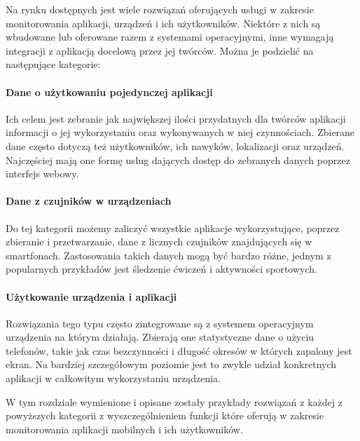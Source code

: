 Na rynku dostępnych jest wiele rozwiązań oferujących usługi w zakresie monitorowania aplikacji, urządzeń i ich użytkowników. Niektóre z nich są wbudowane lub oferowane razem z systemami operacyjnymi, inne wymagają integracji z aplikacją docelową przez jej twórców. Można je podzielić na następujące kategorie:

\paragraph{Dane o użytkowaniu pojedynczej aplikacji} 
Ich celem jest zebranie jak największej ilości przydatnych dla twórców aplikacji informacji o jej wykorzystaniu oraz wykonywanych w niej czynnościach. Zbierane dane często dotyczą też użytkowników, ich nawyków, lokalizacji oraz urządzeń. Najczęściej mają one formę usług dających dostęp do zebranych danych poprzez interfejs webowy. 

\paragraph{Dane z czujników w urządzeniach} 
Do tej kategorii możemy zaliczyć wszystkie aplikacje wykorzystujące, poprzez zbieranie i przetwarzanie, dane z licznych czujników znajdujących się w smartfonach. Zastosowania takich danych mogą być bardzo różne, jednym z popularnych przykładów jest śledzenie ćwiczeń i aktywności sportowych.

\paragraph{Użytkowanie urządzenia i aplikacji} 
Rozwiązania tego typu często zintegrowane są z systemem operacyjnym urządzenia na którym działają. Zbierają one statystyczne dane o użyciu telefonów, takie jak czas bezczynności i długość okresów w których zapalony jest ekran. Na bardziej szczegółowym poziomie jest to zwykle udział konkretnych aplikacji w całkowitym wykorzystaniu urządzenia.
\bigskip

W tym rozdziale wymienione i opisane zostały przykłady rozwiązań z każdej z powyższych kategorii z wyszczególnieniem funkcji które oferują w zakresie monitorowania aplikacji mobilnych i ich użytkowników.
